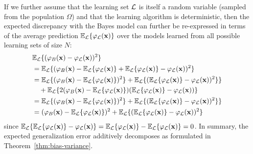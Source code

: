 If we further assume that the learning set ${\cal L}$ is itself a random
variable (sampled from the population $\Omega$) and that the learning algorithm is deterministic, then the expected
discrepancy with the Bayes model can further be re-expressed in terms of the
average prediction $\mathbb{E}_{\cal L} \{ \varphi_{\cal L}(\mathbf{x}) \}$
over the models learned from all possible learning sets of size $N$:
\begin{align}
& \mathbb{E}_{\cal L} \{ (\varphi_B(\mathbf{x}) - \varphi_{\cal L}(\mathbf{x}))^2 \}\nonumber \\
&= \mathbb{E}_{\cal L} \{ (\varphi_B(\mathbf{x}) - \mathbb{E}_{\cal L} \{ \varphi_{\cal L}(\mathbf{x}) \} + \mathbb{E}_{\cal L} \{ \varphi_{\cal L}(\mathbf{x}) \} - \varphi_{\cal L}(\mathbf{x}))^2 \} \nonumber \\
&= \mathbb{E}_{\cal L} \{ (\varphi_B(\mathbf{x}) - \mathbb{E}_{\cal L} \{ \varphi_{\cal L}(\mathbf{x}) \} )^2 \} + \mathbb{E}_{\cal L} \{ (\mathbb{E}_{\cal L} \{ \varphi_{\cal L}(\mathbf{x}) \} - \varphi_{\cal L}(\mathbf{x}))^2 \} \}\nonumber \\
& \quad+ \mathbb{E}_{\cal L} \{ 2(\varphi_B(\mathbf{x}) - \mathbb{E}_{\cal L} \{ \varphi_{\cal L}(\mathbf{x}) \})(\mathbb{E}_{\cal L} \{ \varphi_{\cal L}(\mathbf{x}) \} - \varphi_{\cal L}(\mathbf{x}))\} \nonumber \\
&= \mathbb{E}_{\cal L} \{ (\varphi_B(\mathbf{x}) - \mathbb{E}_{\cal L} \{ \varphi_{\cal L}(\mathbf{x}) \} )^2 \} + \mathbb{E}_{\cal L} \{ (\mathbb{E}_{\cal L} \{ \varphi_{\cal L}(\mathbf{x}) \} - \varphi_{\cal L}(\mathbf{x}))^2 \} \}\nonumber \\
&= (\varphi_B(\mathbf{x}) - \mathbb{E}_{\cal L} \{ \varphi_{\cal L}(\mathbf{x}) \} )^2 + \mathbb{E}_{\cal L} \{ (\mathbb{E}_{\cal L} \{ \varphi_{\cal L}(\mathbf{x}) \} - \varphi_{\cal L}(\mathbf{x}))^2 \}
\end{align}
since $\mathbb{E}_{\cal L}\{ \mathbb{E}_{\cal L} \{ \varphi_{\cal
L}(\mathbf{x}) \} - \varphi_{\cal L}(\mathbf{x}) \} =  \mathbb{E}_{\cal L} \{
\varphi_{\cal L}(\mathbf{x}) \} -  \mathbb{E}_{\cal L} \{ \varphi_{\cal
L}(\mathbf{x}) \} = 0$. In summary, the expected generalization error additively
decomposes as formulated in Theorem~\ref{thm:bias-variance}.

